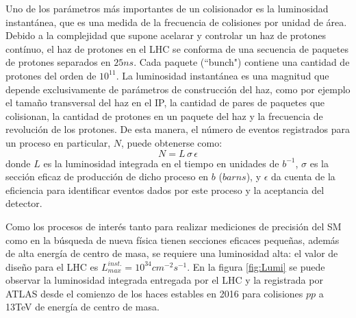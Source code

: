 Uno de los parámetros más importantes de un colisionador es la luminosidad instantánea, que es una medida de la frecuencia de colisiones por unidad de área. 
Debido a la complejidad que supone acelarar y controlar un haz de protones contínuo, el haz de protones en el LHC se conforma de una secuencia de paquetes de protones separados en $25ns$. Cada paquete (``bunch") contiene una cantidad de protones del orden de $10^{11}$.
La luminosidad instantánea es una magnitud que depende exclusivamente de parámetros de construcción del haz, como por ejemplo el tamaño transversal del haz en el IP, la cantidad de pares de paquetes que colisionan, la cantidad de protones en un paquete del haz y la frecuencia de revolución de los protones.
De esta manera, el número de eventos registrados para un proceso en particular, $N$, puede obtenerse como: 
$$N = L\,\sigma\,\epsilon$$
\noindent donde $L$ es la luminosidad integrada en el tiempo en unidades de $b^{-1}$, $\sigma$ es la sección eficaz de producción de dicho proceso en $b$ ($barns$), y $\epsilon$  da cuenta de la eficiencia para identificar eventos dados por este proceso y la aceptancia del detector. 

Como los procesos de interés tanto para realizar mediciones de precisión del SM como en la búsqueda de nueva física tienen secciones eficaces pequeñas, además de alta energía de centro de masa, se requiere una luminosidad alta: el valor de diseño para el LHC es $L_{max}^{inst.}=10^{34}cm^{-2}s^{-1}$. En la figura \ref{fig:Lumi} se puede observar la luminosidad integrada entregada por el LHC y la registrada por ATLAS desde el comienzo de los haces estables en 2016 para colisiones $pp$ a 13TeV de energía de centro de masa.  

